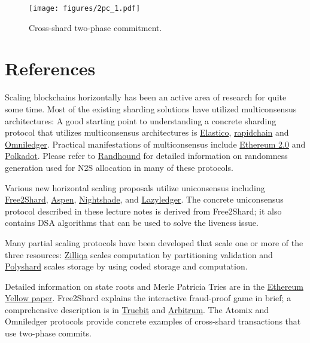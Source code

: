 \documentclass{article}
\begin{document}
\begin{figure}
     \centering
     \texttt{[image: figures/2pc\_1.pdf]}
   \caption{Cross-shard two-phase commitment.}
   \label{fig:2pc}
\end{figure}

\section*{References}

Scaling blockchains horizontally has been an active area of research for quite some time. Most of the existing sharding solutions have utilized multiconsensus architectures: A good starting point to understanding a concrete sharding protocol that utilizes multiconsensus architectures is \href{https://loiluu.com/papers/elastico.pdf}{Elastico}, \href{https://eprint.iacr.org/2018/460.pdf}{rapidchain}
and \href{https://eprint.iacr.org/2017/406.pdf}{Omniledger}. Practical manifestations of multiconsensus include \href{https://ethereum.org/en/eth2/shard-chains/}{Ethereum 2.0} and \href{https://polkadot.network/technology/}{Polkadot}. Please refer to \href{https://eprint.iacr.org/2016/1067.pdf}{Randhound} for detailed information on randomness generation used for N2S allocation in many of these protocols. 

Various new horizontal scaling proposals utilize uniconsensus including
\href{https://arxiv.org/abs/2005.09610}{Free2Shard},
\href{https://arxiv.org/abs/1611.06816}{Aspen},
\href{https://near.org/downloads/Nightshade.pdf}{Nightshade}, and \href{https://arxiv.org/abs/1905.09274}{Lazyledger}. The concrete uniconsensus protocol described in these lecture notes is derived from Free2Shard; it also contains DSA algorithms that can be used to solve the liveness issue. 

Many partial scaling protocols have been developed that scale one or more of the three resources:  \href{https://www.zilliqa.com/}{Zilliqa} scales computation by partitioning validation and \href{https://arxiv.org/abs/1809.10361}{Polyshard} scales storage by using coded storage and computation. 

Detailed information on state roots and Merle Patricia Tries are in the  \href{https://ethereum.github.io/yellowpaper/paper.pdf}{Ethereum Yellow paper}. Free2Shard explains the interactive fraud-proof game in brief; a comprehensive description is in  \href{https://people.cs.uchicago.edu/~teutsch/papers/truebit.pdf}{Truebit} and \href{https://www.usenix.org/conference/usenixsecurity18/presentation/kalodner}{Arbitrum}. The Atomix and  Omniledger protocols provide  concrete examples of cross-shard transactions that use two-phase commits.
\end{document}

